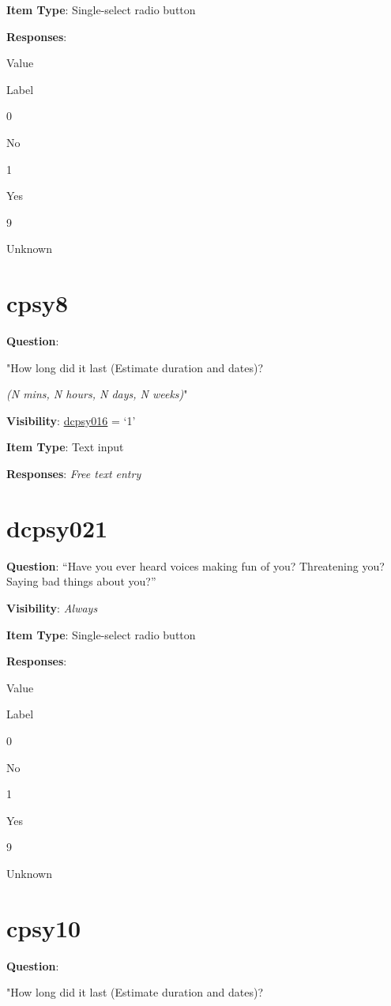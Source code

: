 \documentclass[]{book}
\begin{document}
\textbf{Item Type}: Single-select radio button

\textbf{Responses}:

Value

Label

0

No

1

Yes

9

Unknown

\hypertarget{cpsy8}{%
\section{cpsy8}\label{cpsy8}}

\textbf{Question}:

"How long did it last (Estimate duration and dates)?

\emph{(N mins, N hours, N days, N weeks)}"

\textbf{Visibility}: \protect\hyperlink{dcpsy016}{dcpsy016} = `1'

\textbf{Item Type}: Text input

\textbf{Responses}: \emph{Free text entry}

\hypertarget{dcpsy021}{%
\section{dcpsy021}\label{dcpsy021}}

\textbf{Question}: ``Have you ever heard voices making fun of you? Threatening you? Saying bad things about you?''

\textbf{Visibility}: \emph{Always}

\textbf{Item Type}: Single-select radio button

\textbf{Responses}:

Value

Label

0

No

1

Yes

9

Unknown

\hypertarget{cpsy10}{%
\section{cpsy10}\label{cpsy10}}

\textbf{Question}:

"How long did it last (Estimate duration and dates)?
\end{document}
